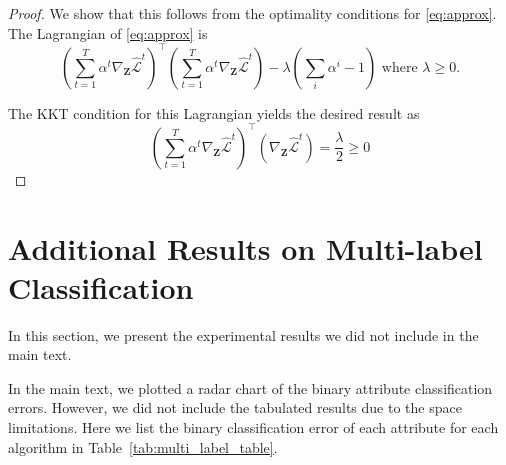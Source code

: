 \documentclass{article}
\begin{document}
\begin{proof}
We show that this follows from the optimality conditions for \ref{eq:approx}. The Lagrangian of \ref{eq:approx} is
\begin{equation}
\left(\sum_{t=1}^T \alpha^t \nabla_{\mathbf{Z}} \hat{\mathcal{L}}^t\right)^\intercal\left(\sum_{t=1}^T \alpha^t \nabla_{\mathbf{Z}} \hat{\mathcal{L}}^t\right) - \lambda \left(\sum_i \alpha^i - 1\right) \text{ where } \lambda\geq 0.
\end{equation}

The KKT condition for this Lagrangian yields the desired result as
\begin{equation}
 \left(\sum_{t=1}^T \alpha^t \nabla_{\mathbf{Z}} \hat{\mathcal{L}}^t\right)^\intercal \left( \nabla_{\mathbf{Z}} \hat{\mathcal{L}}^t \right) = \frac{\lambda}{2} \geq 0
 \end{equation}
\end{proof}
 \section{Additional Results on Multi-label Classification}


In this section, we present the experimental results we did not include in the main text. 

\label{sec:multi_label_error}
In the main text, we plotted a radar chart of the binary attribute classification errors. However, we did not include the tabulated results due to the space limitations. Here we list the binary classification error of each attribute for each algorithm in Table~\ref{tab:multi_label_table}.
\end{document}
